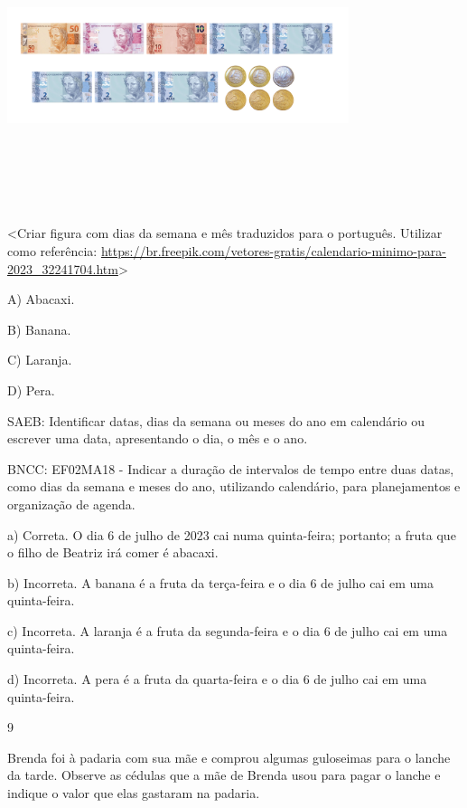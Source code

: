 \begin{escolha}
\begin{escolha}
{{{{\includegraphics[width=3.93750in,height=3.28945in]{media/image156.png}

\textless{}Criar figura com dias da semana e mês traduzidos para o
português. Utilizar como referência:
\url{https://br.freepik.com/vetores-gratis/calendario-minimo-para-2023_32241704.htm}\textgreater{}

A) Abacaxi.

B) Banana.

C) Laranja.

D) Pera.

SAEB: Identificar datas, dias da semana ou meses do ano em
calendário ou escrever uma data, apresentando o dia, o mês e o ano.

BNCC: EF02MA18 - Indicar a duração de intervalos de tempo entre duas
datas, como dias da semana e meses do ano, utilizando calendário, para
planejamentos e organização de agenda.

a) Correta. O dia 6 de julho de 2023 cai numa quinta-feira; portanto; a
fruta que o filho de Beatriz irá comer é abacaxi.

b) Incorreta. A banana é a fruta da terça-feira e o dia 6 de julho cai
em uma quinta-feira.

c) Incorreta. A laranja é a fruta da segunda-feira e o dia 6 de julho
cai em uma quinta-feira.

d) Incorreta. A pera é a fruta da quarta-feira e o dia 6 de julho cai em uma quinta-feira.

\num{9}

Brenda foi à padaria com sua mãe e comprou algumas guloseimas para o
lanche da tarde. Observe as cédulas que a mãe de Brenda usou para pagar
o lanche e indique o valor que elas gastaram na padaria.

}}}}
\end{escolha}
\end{escolha}

